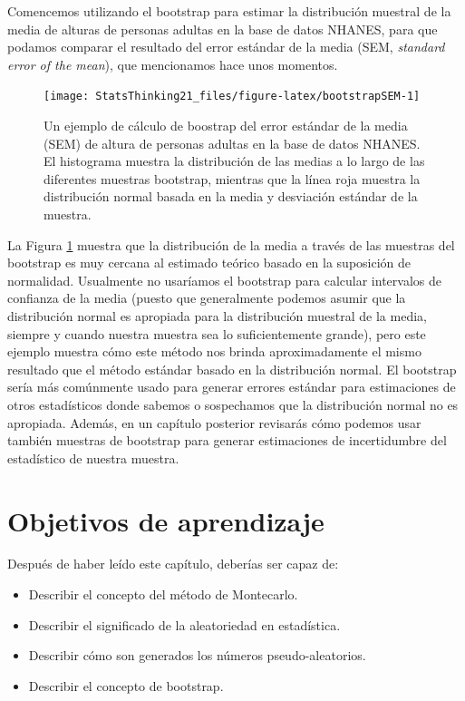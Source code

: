 \documentclass[
  12pt,
]{book}
\providecommand{\tightlist}{%
  \setlength{\itemsep}{0pt}\setlength{\parskip}{0pt}}
\begin{document}
Comencemos utilizando el bootstrap para estimar la distribución muestral de la media de alturas de personas adultas en la base de datos NHANES, para que podamos comparar el resultado del error estándar de la media (SEM, \emph{standard error of the mean}), que mencionamos hace unos momentos.

\begin{figure}
\texttt{[image: StatsThinking21\_files/figure-latex/bootstrapSEM-1]} \caption{Un ejemplo de cálculo de boostrap del error estándar de la media (SEM) de altura de personas adultas en la base de datos NHANES. El histograma muestra la distribución de las medias a lo largo de las diferentes muestras bootstrap, mientras que la línea roja muestra la distribución normal basada en la media y desviación estándar de la muestra.}\label{fig:bootstrapSEM}
\end{figure}

La Figura \ref{fig:bootstrapSEM} muestra que la distribución de la media a través de las muestras del bootstrap es muy cercana al estimado teórico basado en la suposición de normalidad. Usualmente no usaríamos el bootstrap para calcular intervalos de confianza de la media (puesto que generalmente podemos asumir que la distribución normal es apropiada para la distribución muestral de la media, siempre y cuando nuestra muestra sea lo suficientemente grande), pero este ejemplo muestra cómo este método nos brinda aproximadamente el mismo resultado que el método estándar basado en la distribución normal. El bootstrap sería más comúnmente usado para generar errores estándar para estimaciones de otros estadísticos donde sabemos o sospechamos que la distribución normal no es apropiada. Además, en un capítulo posterior revisarás cómo podemos usar también muestras de bootstrap para generar estimaciones de incertidumbre del estadístico de nuestra muestra.

\hypertarget{objetivos-de-aprendizaje-7}{%
\section{Objetivos de aprendizaje}\label{objetivos-de-aprendizaje-7}}

Después de haber leído este capítulo, deberías ser capaz de:

\begin{itemize}
\tightlist
\item
  Describir el concepto del método de Montecarlo.
\item
  Describir el significado de la aleatoriedad en estadística.
\item
  Describir cómo son generados los números pseudo-aleatorios.
\item
  Describir el concepto de bootstrap.
\end{itemize}
\end{document}
